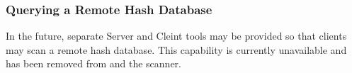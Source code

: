 \documentclass[11pt,fleqn]{article} %
\begin{document}
\subsubsection{Querying a Remote Hash Database}
In the future, separate \hdb Server and Cleint tools may be provided so that clients may scan a remote hash database.  This capability is currently unavailable and has been removed from \hdb and the \bulk \hdb scanner.


%
%
%
%
%
\end{document}
